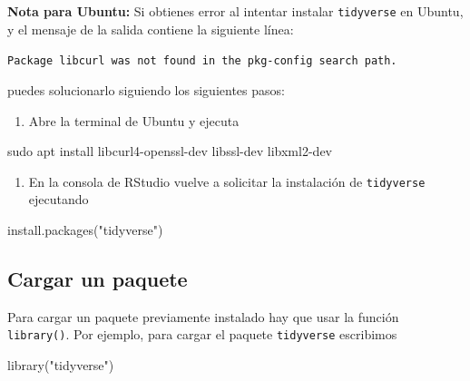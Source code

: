 \documentclass[
  degree=mecinf,
  title=normal,
  toc=normal,
  bib=normal]{mnye}
\providecommand{\tightlist}{%
  \setlength{\itemsep}{0pt}\setlength{\parskip}{0pt}}
\newenvironment{Shaded}{\begin{snugshade}}{\end{snugshade}}
\newcommand{\FunctionTok}[1]{\textcolor[rgb]{0.00,0.00,0.00}{#1}}
\newcommand{\NormalTok}[1]{#1}
\newcommand{\StringTok}[1]{\textcolor[rgb]{0.31,0.60,0.02}{#1}}
\begin{document}
\begin{infobox}

\textbf{Nota para Ubuntu:} Si obtienes error al intentar instalar \texttt{tidyverse} en Ubuntu, y el mensaje de la salida contiene la siguiente línea:

\texttt{Package\ libcurl\ was\ not\ found\ in\ the\ pkg-config\ search\ path.}

puedes solucionarlo siguiendo los siguientes pasos:

\begin{enumerate}
\def\labelenumi{\arabic{enumi}.}
\tightlist
\item
  Abre la terminal de Ubuntu y ejecuta
\end{enumerate}

\begin{Shaded}
\begin{Highlighting}[]
\FunctionTok{sudo}\NormalTok{ apt install libcurl4{-}openssl{-}dev libssl{-}dev libxml2{-}dev}
\end{Highlighting}
\end{Shaded}

\begin{enumerate}
\def\labelenumi{\arabic{enumi}.}
\setcounter{enumi}{1}
\tightlist
\item
  En la consola de \textsf{RStudio} vuelve a solicitar la instalación de \texttt{tidyverse} ejecutando
\end{enumerate}

\begin{Shaded}
\begin{Highlighting}[]
\FunctionTok{install.packages}\NormalTok{(}\StringTok{"tidyverse"}\NormalTok{)}
\end{Highlighting}
\end{Shaded}

\end{infobox}

\hypertarget{cargar-un-paquete}{%
\subsection{Cargar un paquete}\label{cargar-un-paquete}}

Para cargar un paquete previamente instalado hay que usar la función \texttt{library()}. Por ejemplo, para cargar el paquete \texttt{tidyverse} escribimos

\begin{Shaded}
\begin{Highlighting}[]
\FunctionTok{library}\NormalTok{(}\StringTok{"tidyverse"}\NormalTok{)}
\end{Highlighting}
\end{Shaded}
\end{document}
